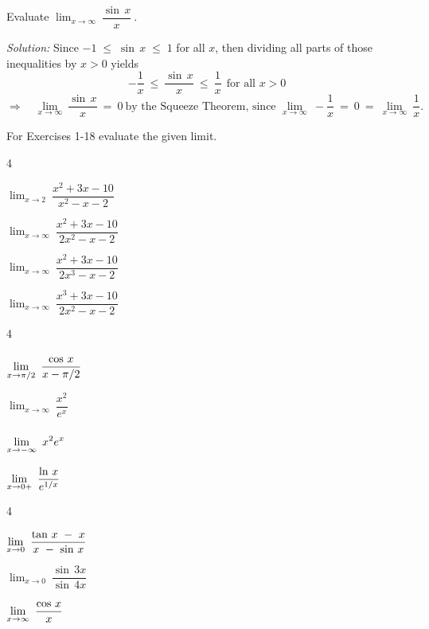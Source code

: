 \begin{exmp}\label{exmp:squeeze}
\noindent Evaluate $\displaystyle\lim_{x \to \infty}~\dfrac{\sin\,x}{x}~$.\vspace{1mm}
\par\noindent\emph{Solution:} Since $-1 \;\le\; \sin\,x \;\le\; 1$ for all $x$,
then dividing all parts of those inequalities by $x > 0$ yields
\[
-\frac{1}{x} ~\le~ \frac{\sin\,x}{x} ~\le~ \frac{1}{x} ~~\text{for all $x > 0$}
\]
\[
\Rightarrow\quad \lim_{x \to \infty}~\frac{\sin\,x}{x} ~=~ 0 ~\text{by
  the Squeeze Theorem, since $\displaystyle\lim_{x \to
    \infty}~-\frac{1}{x} ~=~ 0 ~=~ \displaystyle\lim_{x \to
    \infty}~\frac{1}{x}$.  }
\]
\end{exmp}
\divider
\newpage
\startexercises\label{sec3dot2}
{\small
{}
\par\noindent For Exercises 1-18 evaluate the given limit.
\begin{enumerate}[\bfseries 1.]
 \begin{multicols}{4}
  \item $\displaystyle\lim_{x \to 2}~ \dfrac{x^2 + 3x - 10}{x^2 - x - 2}$
  \item $\displaystyle\lim_{x \to \infty}~ \dfrac{x^2 + 3x - 10}{2x^2 - x - 2}$
  \item $\displaystyle\lim_{x \to \infty}~ \dfrac{x^2 + 3x - 10}{2x^3 - x - 2}$
  \item $\displaystyle\lim_{x \to \infty}~ \dfrac{x^3 + 3x - 10}{2x^2 - x - 2}$
 \end{multicols}
 \begin{multicols}{4}
  \item $\displaystyle\lim_{x \to \pi/2}~ \dfrac{\cos\,x}{x - \pi/2}\vphantom{\dfrac{x^2}{e^x}}$
  \item $\displaystyle\lim_{x \to \infty}~ \dfrac{x^2}{e^x}$
  \item $\displaystyle\lim_{x \to -\infty}~ x^2 e^x\vphantom{\dfrac{x^2}{e^x}}$
  \item $\displaystyle\lim_{x \to 0+}~ \dfrac{\ln\,x}{e^{1/x}}\vphantom{\dfrac{x^2}{e^x}}$
 \end{multicols}
 \begin{multicols}{4}
  \item $\displaystyle\lim_{x \to 0}~ \dfrac{\tan\,x ~-~ x}{x ~-~ \sin\,x}\vphantom{\dfrac{\sin\,3x}{\sin\,4x}}$
  \item $\displaystyle\lim_{x \to 0}~ \dfrac{\sin\,3x}{\sin\,4x}$
  \item $\displaystyle\lim_{x \to \infty}~ \dfrac{\cos\,x}{x}\vphantom{\dfrac{\sin\,3x}{\sin\,4x}}$

\end{multicols}
\end{enumerate}}
